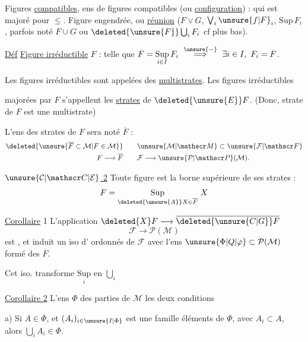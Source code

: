 Figures \uline{compatibles}, ens de figures  compatibles   (ou \uline{configuration}) : qui est majoré pour $\leq$.  Figure engendrée, ou \uline{réunion} ($F\vee G$, $\bigvee_i\unsure{f|F}_i$, $\mathrm{Sup}\,F_i$, parfois noté $F\cup G$ ou $\deleted{\unsure{F}}\bigcup_iF_i$ cf plus bas).

\uline{Déf} \uline{Figure irréductible} $F$ : telle que $\displaystyle F=\underset{i\in I}{\mathrm{Sup}}\,F_i\ \overset{\unsure{-}}{\Longrightarrow}\ \exists i\in I,\ F_i=F$.

 Les figures irréductibles sont appelées des \uline{multistrates}.  Les figures irréductibles


majorées par $F$ s'appellent les \uline{strates} de $\deleted{\unsure{E}}F$. (Donc,  strate de $F$ est une multistrate)

L'ens des strates de $F$  sera noté $\overline F$ : \[ \begin{aligned} \deleted{\unsure{\overline F\subset\mathcal M|F\in\mathcal M}} &\qquad \unsure{\mathcal M|\mathscr M}\subset\unsure{\mathcal F|\mathscr F}\\ F\longrightarrow\overline F &\qquad \mathcal F\longrightarrow\unsure{\mathcal P|\mathscr P}(\mathcal M). \end{aligned} \]

\uline{$\unsure{\mathcal C|\mathscr C|\mathcal E}$ 2} Toute figure est la borne supérieure de ses strates : \[ F=\underset{\deleted{\unsure{A}}X\in\overline F}{\mathrm{Sup}}\ X \]

\uline{Corollaire} 1 L'application $\deleted{X}F\longrightarrow\overline{\deleted{\unsure{C|G}}F}$ \[ \mathcal F\longrightarrow\mathcal P(\mathcal M) \] est , et induit un iso d' ordonnés de $\mathcal F$ avec l'ens $\unsure{\Phi|Q|\varphi}\subset\mathcal P(\mathcal M)$ formé des $\overline F$.

Cet iso. transforme $\underset{i}{\mathrm{Sup}}$ en $\bigcup_i$

\uline{Corollaire 2} L'ens $\Phi$ des parties de $\mathcal M$  les deux conditions


 a) Si $A\in\Phi$, et $(A_i)_{i\in\unsure{I|\Phi}}$ est une famille éléments de $\Phi$, avec $A_i\subset A$, alors $\bigcup_iA_i\in\Phi$.

